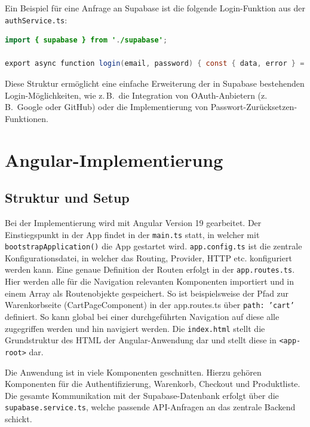 \documentclass[oneside]{ausarbeitung}
\begin{document}
Ein Beispiel für eine Anfrage an Supabase ist die folgende Login-Funktion aus der \texttt{authService.ts}:

\begin{lstlisting}[language=Java, caption={Login-Funktion im \texttt{authService.ts}}] import { supabase } from './supabase';

export async function login(email, password) { const { data, error } = await supabase.auth.signInWithPassword({ email, password, }); if (error) throw error; return data; } \end{lstlisting}

Diese Struktur ermöglicht eine einfache Erweiterung der in Supabase bestehenden Login-Möglichkeiten, wie z.\,B.\ die Integration von OAuth-Anbietern (z.\,B.\ Google oder GitHub) oder die Implementierung von Passwort-Zurücksetzen-Funktionen.

\section{Angular-Implementierung}
\subsection{Struktur und Setup}

Bei der Implementierung wird mit Angular Version 19 gearbeitet. Der Einstiegspunkt in der App findet in der \texttt{main.ts} statt, in welcher mit \texttt{bootstrapApplication()} die App gestartet wird. \texttt{app.config.ts} ist die zentrale Konfigurationsdatei, in welcher das Routing, Provider, HTTP etc. konfiguriert werden kann. Eine genaue Definition der Routen erfolgt in der \texttt{app.routes.ts}. Hier werden alle für die Navigation relevanten Komponenten importiert und in einem Array als Routenobjekte gespeichert. So ist beispielsweise der Pfad zur Warenkorbseite (CartPageComponent) in der app.routes.ts über \texttt{path: 'cart'} definiert. So kann global bei einer durchgeführten Navigation auf diese alle zugegriffen werden und hin navigiert werden. Die \texttt{index.html} stellt die Grundstruktur des HTML der Angular-Anwendung dar und stellt diese in \texttt{<app-root>} dar.

Die Anwendung ist in viele Komponenten geschnitten. Hierzu gehören Komponenten für die Authentifizierung, Warenkorb, Checkout und Produktliste. Die gesamte Kommunikation mit der Supabase-Datenbank erfolgt über die \texttt{supabase.service.ts}, welche passende API-Anfragen an das zentrale Backend schickt.
\end{document}
